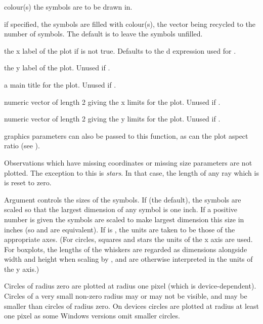 \begin{Arguments}
\begin{ldescription}
\item[\code{fg}] colour(s) the symbols are to be drawn in.
\item[\code{bg}] if specified, the symbols are filled with colour(s), the
vector  being recycled to the number of symbols.
The default is to leave the symbols unfilled.
\item[\code{xlab}] the x label of the plot if  is not true.
Defaults to the d expression used for .
\item[\code{ylab}] the y label of the plot.  Unused if .
\item[\code{main}] a main title for the plot.  Unused if .
\item[\code{xlim}] numeric vector of length 2 giving the x limits for the
plot.  Unused if .
\item[\code{ylim}] numeric vector of length 2 giving the y limits for the
plot.  Unused if .
\item[\code{...}] graphics parameters can also be passed to this function,
as can the plot aspect ratio  (see ).
\end{ldescription}
\end{Arguments}
%
\begin{Details}\relax
Observations which have missing coordinates or missing size
parameters are not plotted.  The exception to this is \emph{stars}.
In that case, the length of any ray which is  is reset
to zero.

Argument  controls the sizes of the symbols.  If
 (the default), the symbols are scaled so that the
largest dimension of any symbol is one inch.  If a positive number is
given the symbols are scaled to make largest dimension this size in
inches (so  and  are equivalent).  If 
is , the units are taken to be those of the appropriate
axes.  (For circles, squares and stars the units of the x axis are
used.  For boxplots, the lengths of the whiskers are regarded as
dimensions alongside width and height when scaling by ,
and are otherwise interpreted in the units of the y axis.)


Circles of radius zero are plotted at radius one pixel (which is
device-dependent).  Circles of a very small non-zero radius may or may
not be visible, and may be smaller than circles of radius zero.  On
 devices circles are plotted at radius at least one
pixel as some Windows versions omit smaller circles.
\end{Details}
